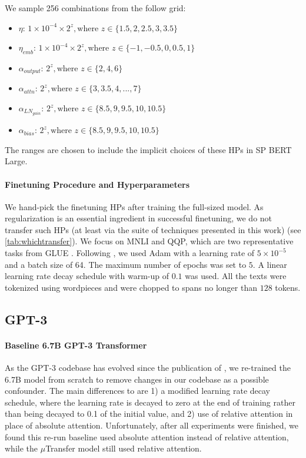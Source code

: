 \documentclass{article}
\theoremstyle{definition}
\begin{document}
We sample 256 combinations from the follow grid:
\begin{itemize}
    \item $\eta$: $1 \times 10^{-4} \times 2^z, \text{where } z\in \{1.5, 2, 2.5, 3, 3.5\}$ 
    \item $\eta_{emb}$: $1 \times 10^{-4} \times 2^z, \text{where } z\in \{-1, -0.5, 0, 0.5, 1\}$ 
    \item $\alpha_{output}$: $2^z, \text{where } z\in \{2, 4, 6\}$
    \item $\alpha_{attn}$: $2^z, \text{where } z\in\{3, 3.5, 4, ..., 7\}$
    \item $\alpha_{LN_{gain}}$: $2^z, \text{where } z\in\{8.5, 9, 9.5, 10, 10.5\}$
    \item $\alpha_{bias}$: $2^z, \text{where } z\in\{8.5, 9, 9.5, 10, 10.5\}$
\end{itemize}
The ranges are chosen to include the implicit choices of these HPs in SP BERT Large.

\paragraph{Finetuning Procedure and Hyperparameters}
We hand-pick the finetuning HPs after training the full-sized model.
As regularization is an essential ingredient in successful finetuning, we do not transfer such HPs (at least via the suite of techniques presented in this work) (see \cref{tab:whichtransfer}).
We focus on MNLI \cite{mnli2018} and QQP, which are two representative tasks from GLUE \cite{wang2018glue}. Following \cite{liu2019mt-dnn}, we used Adam \cite{kingma2014adam} with a learning rate of $5\times 10^{-5}$ and a batch size of 64.
The maximum number of epochs was set to $5$. 
A linear learning rate decay schedule with warm-up of $0.1$ was used. 
All the texts were tokenized using wordpieces and were chopped to spans no longer than $128$ tokens. 

\subsection{GPT-3}
\label{sec:gpt3-appendix}

\paragraph{Baseline 6.7B GPT-3 Transformer}
As the GPT-3 codebase has evolved since the publication of \citep{brown2020language}, we re-trained the 6.7B model from scratch to remove changes in our codebase as a possible confounder.
The main differences to \citep{brown2020language} 
are 1) a modified learning rate decay schedule, where the learning rate is decayed to zero at the end of training rather than being decayed to 0.1 of the initial value, and 2) use of relative attention in place of absolute attention.
Unfortunately, after all experiments were finished, we found this re-run baseline used absolute attention instead of relative attention, while the $\mu$Transfer model still used relative attention.
\end{document}
